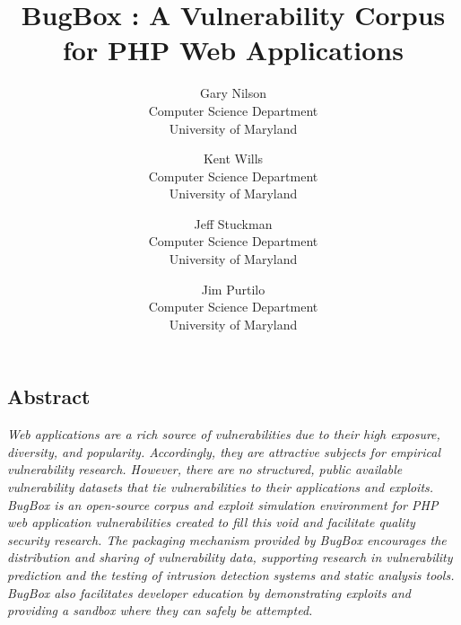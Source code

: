 \documentclass[letterpaper,twocolumn,10pt]{article}
\begin{document}
\date{}


\title{\Large \bf BugBox : A Vulnerability Corpus for PHP Web Applications}


\author{
{\rm Gary Nilson}\\
Computer Science Department\\
University of Maryland
\and
{\rm Kent Wills}\\
Computer Science Department\\
University of Maryland
\and
{\rm Jeff Stuckman}\\
Computer Science Department\\
University of Maryland
\and
{\rm Jim Purtilo}\\
Computer Science Department\\
University of Maryland
} %

\maketitle



 
 

\subsection*{Abstract}
\textit{
Web applications are a rich source of vulnerabilities due to their high exposure, diversity, and popularity. Accordingly, they are attractive subjects for empirical vulnerability research. However, there are no structured, public available vulnerability datasets that tie vulnerabilities to their applications and exploits. BugBox is an open-source corpus and exploit simulation environment for PHP web application vulnerabilities created to fill this void and facilitate quality security research. The packaging mechanism provided by BugBox encourages the distribution and sharing of vulnerability data, supporting research in vulnerability prediction and the testing of intrusion detection systems and static analysis tools. BugBox also facilitates developer education by demonstrating exploits and providing a sandbox where they can safely be attempted.
}
\end{document}
